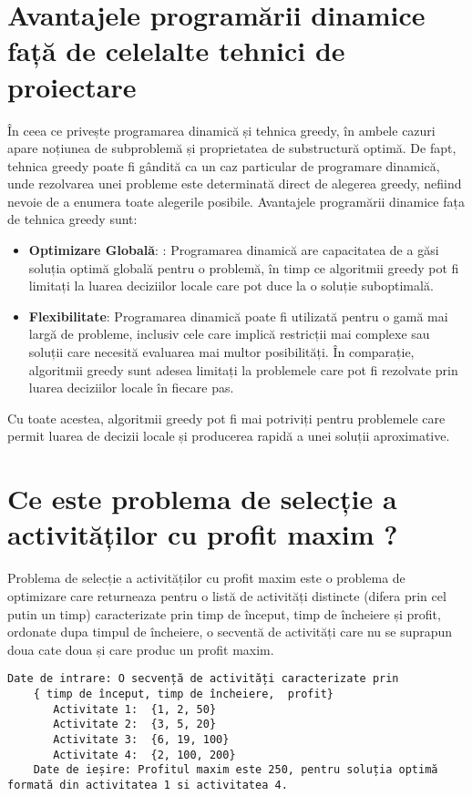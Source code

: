 \section{Avantajele programării dinamice față de celelalte tehnici de proiectare}
În ceea ce privește programarea dinamică și tehnica greedy, 
în ambele cazuri apare noțiunea de subproblemă și proprietatea de substructură optimă. De fapt, tehnica greedy poate fi gândită ca un caz particular de programare dinamică, unde rezolvarea unei probleme este determinată direct de alegerea greedy, nefiind nevoie de a
enumera toate alegerile posibile.\cite{Curs} Avantajele programării dinamice fața de tehnica greedy sunt:
\begin{itemize}
  \item \textbf {Optimizare Globală}: : Programarea dinamică are capacitatea de a găsi soluția optimă globală pentru o problemă, în timp ce algoritmii greedy pot fi limitați la luarea deciziilor locale care pot duce la o soluție suboptimală.
  \item \textbf {Flexibilitate}: Programarea dinamică poate fi utilizată pentru o gamă mai largă de probleme, inclusiv cele care implică restricții mai complexe sau soluții care necesită evaluarea mai multor posibilități. În comparație, algoritmii greedy sunt adesea limitați la problemele care pot fi rezolvate prin luarea deciziilor locale în fiecare pas.
  
\end{itemize}
Cu toate acestea, algoritmii greedy pot fi mai potriviți pentru problemele care permit luarea de decizii locale și producerea rapidă a unei soluții aproximative.


\section{Ce este problema de selecție a activităților cu profit maxim ?}
Problema de selecție a activităților cu profit maxim este o problema de optimizare care returneaza pentru o listă de activități distincte (difera prin cel putin un timp) caracterizate prin timp de început, timp de încheiere și profit,  ordonate dupa timpul de încheiere, o secventă de activități care nu se suprapun doua cate doua și care produc un profit maxim. 
\begin{lstlisting}[numbers=None]
    Date de intrare: O secvență de activități caracterizate prin
    { timp de început, timp de încheiere,  profit}
       Activitate 1:  {1, 2, 50} 
       Activitate 2:  {3, 5, 20}
       Activitate 3:  {6, 19, 100}
       Activitate 4:  {2, 100, 200}
    Date de ieșire: Profitul maxim este 250, pentru soluția optimă formată din activitatea 1 si activitatea 4.
\end{lstlisting}

